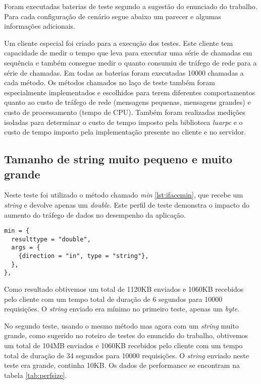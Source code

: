 \documentclass[11pt]{article}
\begin{document}
Foram executadas baterias de teste segundo a sugestão do enunciado do trabalho.
Para cada configuração de cenário segue abaixo um parecer e algumas informações
adicionais.

Um cliente especial foi criado para a execução dos testes. Este cliente tem
capacidade de medir o tempo que leva para executar uma série de chamadas em
sequência e também consegue medir o quanto consumiu de tráfego de rede para a
série de chamadas. Em todas as baterias foram executadas 10000 chamadas a cada
método. Os métodos chamados no laço de teste também foram especialmente
implementados e escolhidos para terem diferentes comportamentos quanto ao custo
de tráfego de rede (mensagens pequenas, mensagens grandes) e custo de
processamento (tempo de CPU). Também foram realizadas medições isoladas para
determinar o custo de tempo imposto pela biblioteca \textit{luarpc} e o custo de
tempo imposto pela implementação presente no cliente e no servidor.

\subsection{Tamanho de string muito pequeno e muito grande}\label{subsec:stringsize}

Neste teste foi utilizado o método chamado \textit{min} \ref{lst:ifacemin}, que
recebe um \textit{string} e devolve apenas um \textit{double}. Este perfil de
teste demonstra o impacto do aumento do tráfego de dados no desempenho da
aplicação.

\begin{lstlisting}[caption={Interface min},label={lst:ifacemin}]
min = {
  resulttype = "double",
  args = {
    {direction = "in", type = "string"},
  },
},
\end{lstlisting}

Como resultado obtivemos um total de 1120KB enviados e 1060KB recebidos pelo
cliente com um tempo total de duração de 6 segundos para 10000 requisições. O
\textit{string} enviado era mínimo no primeiro teste, apenas um \textit{byte}.

No segundo teste, usando o mesmo método mas agora com um \textit{string} muito
grande, como sugerido no roteiro de testes do enuncido do trabalho, obtivemos um
total de 104MB enviados e 1060KB recebidos pelo cliente com um tempo total de
duração de 34 segundos para 10000 requisições. O \textit{string} enviado neste
teste era grande, continha 10KB. Os dados de performance se encontram na tabela
\ref{tab:perfsize}.
\end{document}
